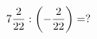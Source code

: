 \documentclass[preview]{standalone}
\begin{document}
\begin{align*}
7 { 2 \over 22 }  :  \left( - { 2 \over 22 } \right)  =  ?
\end{align*}
\end{document}
